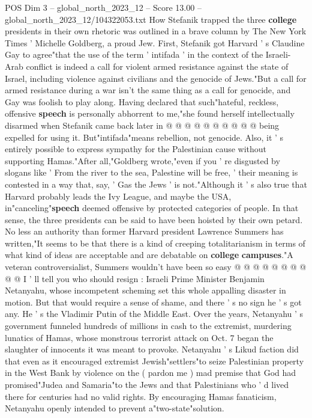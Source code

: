 \begin{textsample}{POS Dim 3 – global\_north\_2023\_12 – Score 13.00 – global\_north\_2023\_12/104322053.txt}
How Stefanik trapped the three \textbf{college} presidents in their own rhetoric was outlined in a brave column by The New York Times ' Michelle Goldberg, a proud Jew.
First, Stefanik got Harvard ' s Claudine Gay to agree"that the use of the term ' intifada ' in the context of the Israeli-Arab conflict is indeed a call for violent armed resistance against the state of Israel, including violence against civilians and the genocide of Jews."But a call for armed resistance during a war isn't the same thing as a call for genocide, and Gay was foolish to play along.
Having declared that such"hateful, reckless, offensive \textbf{speech} is personally abhorrent to me,"she found herself intellectually disarmed when Stefanik came back later in @ @ @ @ @ @ @ @ @ @ being expelled for using it.
But"intifada"means rebellion, not genocide.
Also, it ' s entirely possible to express sympathy for the Palestinian cause without supporting Hamas."After all,"Goldberg wrote,"even if you ' re disgusted by slogans like ' From the river to the sea, Palestine will be free, ' their meaning is contested in a way that, say, ' Gas the Jews ' is not."Although it ' s also true that Harvard probably leads the Ivy League, and maybe the USA, in"canceling"\textbf{speech} deemed offensive by protected categories of people.
In that sense, the three presidents can be said to have been hoisted by their own petard.
No less an authority than former Harvard president Lawrence Summers has written,"It seems to be that there is a kind of creeping totalitarianism in terms of what kind of ideas are acceptable and are debatable on \textbf{college} \textbf{campuses}."A veteran controversialist, Summers wouldn't have been so easy @ @ @ @ @ @ @ @ @ @ I ' ll tell you who should resign : Israeli Prime Minister Benjamin Netanyahu, whose incompetent scheming set this whole appalling disaster in motion.
But that would require a sense of shame, and there ' s no sign he ' s got any.
He ' s the Vladimir Putin of the Middle East.
Over the years, Netanyahu ' s government funneled hundreds of millions in cash to the extremist, murdering lunatics of Hamas, whose monstrous terrorist attack on Oct. 7 began the slaughter of innocents it was meant to provoke.
Netanyahu ' s Likud faction did that even as it encouraged extremist Jewish"settlers"to seize Palestinian property in the West Bank by violence on the ( pardon me ) mad premise that God had promised"Judea and Samaria"to the Jews and that Palestinians who ' d lived there for centuries had no valid rights.
By encouraging Hamas fanaticism, Netanyahu openly intended to prevent a"two-state"solution.

\end{textsample}
